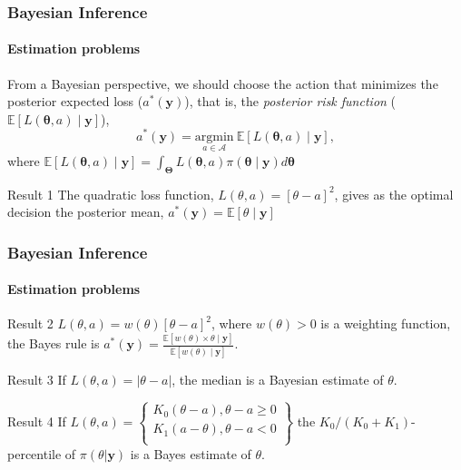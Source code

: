 \documentclass[12pt, compress]{beamer}
\begin{document}
\begin{frame}
	\frametitle{Bayesian Inference}
	\framesubtitle{Estimation problems}
	From a Bayesian perspective, we should choose the action that minimizes the posterior expected loss ($a^*(\mathbf{y})$), that is, the \textit{posterior risk function} ($\mathbb{E}[L(\mathbf{\theta}, a)\mid \mathbf{y}]$),
	\begin{equation*}
		a^*(\mathbf{y})=\underset{a \in \mathcal{A}}{\mathrm{argmin}} \  \mathbb{E}[L(\mathbf{\theta}, a)\mid \mathbf{y}], 
	\end{equation*}
	where $\mathbb{E}[L(\mathbf{\theta}, a)\mid \mathbf{y}] = \int_{\mathbf{\Theta}} L(\mathbf{\theta}, a)\pi(\mathbf{\theta}\mid \mathbf{y})d\mathbf{\theta}$
	\begin{block}{Result 1}
		The quadratic loss function, $L(\theta,a)=[\theta-a]^2$, gives as the optimal decision the posterior mean, $a^*(\mathbf{y})=\mathbb{E}[\theta \mid \mathbf{y}]$
	\end{block}

\end{frame}

\begin{frame}
	\frametitle{Bayesian Inference}
	\framesubtitle{Estimation problems}
	\begin{block}{Result 2}
	$L(\theta,a) = w(\theta) [\theta - a]^2$, where $w(\theta) > 0$ is a weighting function, the Bayes rule is $a^*(\mathbf{y}) = \frac{\mathbb{E}[w(\theta) \times \theta \mid \mathbf{y}]}{\mathbb{E}[w(\theta) \mid \mathbf{y}]}.$
	\end{block}
	\begin{block}{Result 3}
		If $L(\theta,a)=|\theta-a|$, the median is a Bayesian estimate of $\theta$.
	\end{block}
	\begin{block}{Result 4}
		If $L(\theta,a)=\begin{Bmatrix}
		K_0(\theta-a), \theta-a\geq 0\\
		K_1(a-\theta), \theta-a< 0\\
		\end{Bmatrix}$
		the $K_0/(K_0+K_1)$-percentile of $\pi(\theta|\boldsymbol{y})$ is a Bayes estimate of $\theta$.
	\end{block}
\end{frame}
\end{document}
